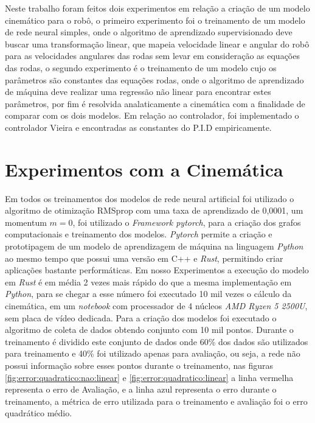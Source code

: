 
\label{Cap:ExperimentosResultados}
Neste trabalho foram feitos dois experimentos em relação a criação
de um modelo cinemático para o robô, o primeiro experimento foi o
treinamento de um modelo de rede neural simples, onde o algoritmo
de aprendizado supervisionado deve buscar uma transformação linear,
que mapeia velocidade linear e angular do robô para as velocidades
angulares das rodas sem levar em consideração as equações das rodas,
o segundo experimento é o treinamento de um modelo cujo os parâmetros
são constantes das equações rodas, onde o algoritmo de aprendizado
de máquina deve realizar uma regressão não linear para encontrar
estes parâmetros, por fim é resolvida analaticamente a cinemática
com a finalidade de comparar com os dois modelos. Em relação ao controlador,
foi implementado o controlador Vieira e encontradas as constantes do P.I.D
empiricamente.


\section{Experimentos com a Cinemática}
Em todos os treinamentos dos modelos
de rede neural artificial foi utilizado o algoritmo de otimização
RMSprop com uma taxa de aprendizado de 0,0001, um momentum $m =0$,
foi utilizado o \textit{Framework pytorch}, para a criação dos
grafos computacionais e treinamento dos modelos. \textit{Pytorch}
permite a criação e prototipagem de um modelo de aprendizagem de
máquina na linguagem \textit{Python} ao mesmo tempo que possui
uma versão em C++ e \textit{Rust}, permitindo criar aplicações
bastante performáticas. Em nosso Experimentos a execução do modelo
em \textit{Rust} é em média 2 vezes mais rápido do que a mesma implementação
em \textit{Python}, para se chegar a esse número foi executado 10 mil vezes o cálculo
da cinemática, em um \textit{notebook} com processador de 4 núcleos \textit{AMD Ryzen 5 2500U},
sem placa de vídeo dedicada. Para a criação dos modelos foi executado o
algoritmo de coleta de dados obtendo conjunto com 10 mil
pontos. Durante o treinamento é dividido este conjunto de dados
onde 60\% dos dados são utilizados para treinamento e 40\% foi utilizado
apenas para avaliação, ou seja, a rede não possui informação sobre esses
pontos durante o treinamento, nas figuras \ref{fig:error:quadratico:nao:linear} e
\ref{fig:error:quadratico:linear} a linha vermelha representa o erro de
Avaliação, e a linha azul representa o erro durante o treinamento,
a métrica de erro utilizada para o treinamento e avaliação
foi o erro quadrático médio.


